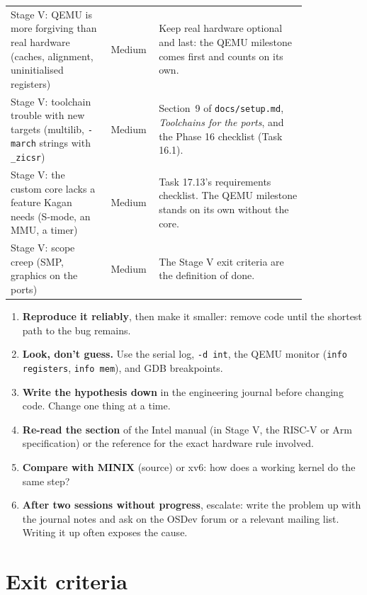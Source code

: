 \documentclass[11pt,a4paper]{article}
\begin{document}
\begin{center}
\begin{longtable}{@{}>{\raggedright\arraybackslash}p{0.33\linewidth} c >{\raggedright\arraybackslash}p{0.5\linewidth}@{}}
Stage V: QEMU is more forgiving than real hardware (caches, alignment, uninitialised registers) & Medium & Keep real hardware optional and last: the QEMU milestone comes first and counts on its own. \\
Stage V: toolchain trouble with new targets (multilib, \texttt{-march} strings with \texttt{\_zicsr}) & Medium & Section~9 of \texttt{docs/setup.md}, \emph{Toolchains for the ports}, and the Phase 16 checklist (Task 16.1). \\
Stage V: the custom core lacks a feature Kagan needs (S-mode, an MMU, a timer) & Medium & Task 17.13's requirements checklist. The QEMU milestone stands on its own without the core. \\
Stage V: scope creep (SMP, graphics on the ports) & Medium & The Stage V exit criteria are the definition of done. \\
\end{longtable}
\end{center}

\begin{tipbox}
\begin{enumerate}
  \item \textbf{Reproduce it reliably}, then make it smaller: remove code until the shortest path to the bug remains.
  \item \textbf{Look, don't guess.} Use the serial log, \texttt{-d int}, the QEMU monitor (\texttt{info registers}, \texttt{info mem}), and GDB breakpoints.
  \item \textbf{Write the hypothesis down} in the engineering journal before changing code. Change one thing at a time.
  \item \textbf{Re-read the section} of the Intel manual (in Stage V, the RISC-V or Arm specification) or the reference for the exact hardware rule involved.
  \item \textbf{Compare with MINIX} (\OSDI source) or xv6: how does a working kernel do the same step?
  \item \textbf{After two sessions without progress}, escalate: write the problem up with the journal notes and ask on the OSDev forum or a relevant mailing list. Writing it up often exposes the cause.
\end{enumerate}
\end{tipbox}

\section{Exit criteria}
\end{document}
